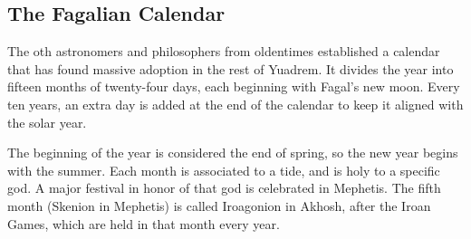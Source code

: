 \subsection*{The Fagalian Calendar} \label{ssec::thefagaliancalendar}
The oth astronomers and philosophers from oldentimes established a calendar that has found massive adoption in the rest of Yuadrem.
It divides the year into fifteen months of twenty-four days, each beginning with Fagal's new moon.
Every ten years, an extra day is added at the end of the calendar to keep it aligned with the solar year.

The beginning of the year is considered the end of spring, so the new year begins with the summer.
Each month is associated to a tide, and is holy to a specific god.
A major festival in honor of that god is celebrated in Mephetis.
The fifth month (Skenion in Mephetis) is called Iroagonion in Akhosh, after the Iroan Games, which are held in that month every year.

